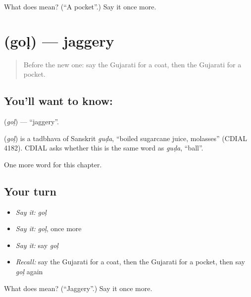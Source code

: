 \begin{tcolorbox}[breakable,colback=teal!4,colframe=teal!35!black,title={Before you move on}]
What does  mean? (\textquotedblleft{}A pocket\textquotedblright{}.) Say it once more.
\end{tcolorbox}
\section[\texorpdfstring{\gu{ગોળ} (goḷ)}{ગોળ (goḷ)}]{ (goḷ) — jaggery}

\label{lesson:GU-C113-gol}



\begin{quote}
Before the new one: say the Gujarati for a coat, then the Gujarati for a pocket.
\end{quote}

\subsection*{You'll want to know: }
\textbf{} (\emph{goḷ}) — \textquotedblleft{}jaggery\textquotedblright{}.

\begin{cousinweb}
\textbf{} (\emph{goḷ}) is a tadbhava of Sanskrit \emph{guḍa}, \textquotedblleft{}boiled sugarcane juice, molasses\textquotedblright{} (CDIAL 4182). CDIAL asks whether this is the same word as \emph{guḍa}, \textquotedblleft{}ball\textquotedblright{}.
\end{cousinweb}

\begin{grammarlens}[title={What you've built}]
One more word for this chapter.
\end{grammarlens}

\subsection*{Your turn}
\begin{itemize}
\raggedright
  \item \emph{Say it:} \emph{goḷ}
  \item \emph{Say it:} \emph{goḷ}, once more
  \item \emph{Say it:} say \emph{goḷ}
  \item \emph{Recall:} say the Gujarati for a coat, then the Gujarati for a pocket, then say \emph{goḷ} again
\end{itemize}

\begin{tcolorbox}[breakable,colback=teal!4,colframe=teal!35!black,title={Before you move on}]
What does  mean? (\textquotedblleft{}Jaggery\textquotedblright{}.) Say it once more.
\end{tcolorbox}
